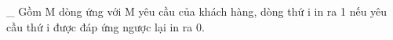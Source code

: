 \_ Gồm M dòng ứng với M yêu cầu của khách hàng, dòng thứ i in ra 1 nếu yêu cầu thứ i được đáp ứng ngược lại in ra 0.